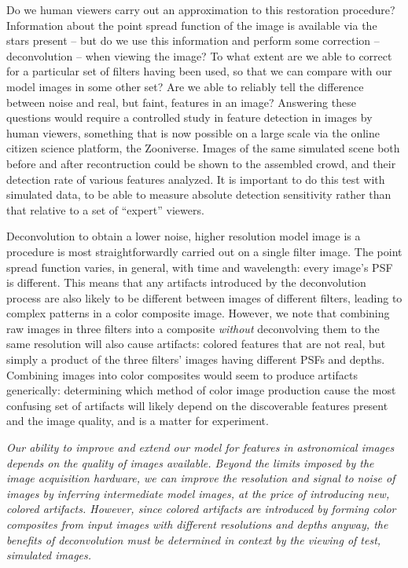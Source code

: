 \documentclass[letterpaper, 11pt]{article}
\begin{document}
Do we human viewers carry out an approximation to this restoration procedure?
Information about the point spread function of the image is available via the
stars present -- but do we use this information and perform some correction --
deconvolution -- when viewing the image? To what extent are we able to correct
for a particular set of filters having been used, so that we can compare with
our model images in some other set? Are we able to reliably tell the
difference between noise and real, but faint, features in an image? Answering
these questions would require a controlled study in feature detection in
images by human viewers, something that is now possible on a large scale via
the online citizen science platform, the Zooniverse. Images of the same
simulated scene both before and after recontruction could be shown to the
assembled crowd, and their detection rate of various features analyzed. It is
important to do this test with simulated data, to be able to measure absolute
detection sensitivity rather than that relative to a set of ``expert''
viewers.

Deconvolution to obtain a lower noise, higher resolution model image is a
procedure is most straightforwardly carried out on a single filter image. The
point spread function varies, in general, with time and wavelength: every
image's PSF is different. This means that any artifacts introduced by the
deconvolution process are also likely to be different between images of
different filters, leading to complex patterns in a color composite image.
However, we note that combining raw images in three filters into a composite
{\it without} deconvolving them to the same resolution will also cause
artifacts: colored features that are not real, but simply a product
of the three filters' images having different PSFs and depths. Combining images into
color composites would seem to produce artifacts generically: determining 
which method of color image production cause the most confusing set of
artifacts will likely depend on the discoverable features present and the
image quality, and is a matter for experiment.

{\it Our ability to improve and extend our model for features in astronomical
images depends on the quality of images available. Beyond the limits imposed
by the image acquisition hardware, we can improve the resolution and signal to
noise of images by inferring intermediate model images, at the price of
introducing new, colored artifacts. However, since colored artifacts are
introduced by forming color composites from input images with different
resolutions and depths anyway, the benefits of deconvolution must be
determined in context by the viewing of test, simulated images.}
\end{document}
